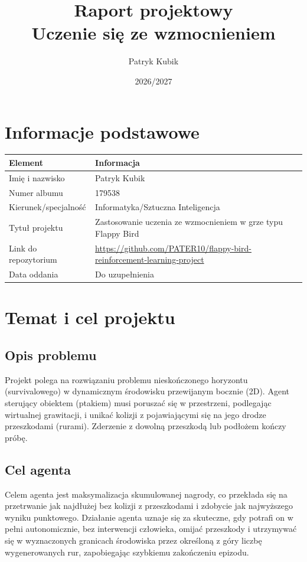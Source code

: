 \documentclass[12pt]{article}
\title{Raport projektowy\\Uczenie się ze wzmocnieniem}
\author{Patryk Kubik}
\date{2026/2027}
\begin{document}
\maketitle
\tableofcontents
\newpage

\section{Informacje podstawowe}

\begin{center}
\begin{tabular}{p{}p{}}
\toprule
Element & Informacja \\
\midrule
Imię i nazwisko & Patryk Kubik \\
Numer albumu & 179538 \\
Kierunek/specjalność & Informatyka/Sztuczna Inteligencja \\
Tytuł projektu & Zastosowanie uczenia ze wzmocnieniem w grze typu Flappy Bird \\
Link do repozytorium & \url{https://github.com/PATER10/flappy-bird-reinforcement-learning-project} \\
Data oddania & Do uzupełnienia \\
\bottomrule
\end{tabular}
\end{center}

\section{Temat i cel projektu}

\subsection{Opis problemu}

Projekt polega na rozwiązaniu problemu nieskończonego horyzontu (survivalowego) w dynamicznym środowisku przewijanym bocznie (2D). Agent sterujący obiektem (ptakiem) musi poruszać się w przestrzeni, podlegając wirtualnej grawitacji, i unikać kolizji z pojawiającymi się na jego drodze przeszkodami (rurami). Zderzenie z dowolną przeszkodą lub podłożem kończy próbę.

\subsection{Cel agenta}

Celem agenta jest maksymalizacja skumulowanej nagrody, co przekłada się na przetrwanie jak najdłużej bez kolizji z przeszkodami i zdobycie jak najwyższego wyniku punktowego. Działanie agenta uznaje się za skuteczne, gdy potrafi on w pełni autonomicznie, bez interwencji człowieka, omijać przeszkody i utrzymywać się w wyznaczonych granicach środowiska przez określoną z góry liczbę wygenerowanych rur, zapobiegając szybkiemu zakończeniu epizodu.
\end{document}
